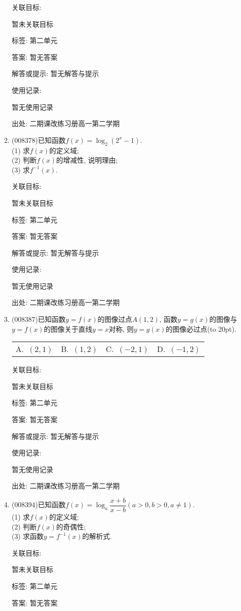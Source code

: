 \documentclass[10pt,a4paper]{article}
\newcommand{\bracket}[1]{(\hbox to #1pt{})}
\newcommand{\fourch}[4]{\par\begin{tabular}{p{.23\textwidth}p{.23\textwidth}p{.23\textwidth}p{.23\textwidth}}
A.~#1 &B.~#2& C.~#3& D.~#4
\end{tabular}}
\begin{document}
\begin{enumerate}[1.]
关联目标:

暂未关联目标



标签: 第二单元

答案: 暂无答案

解答或提示: 暂无解答与提示

使用记录:

暂无使用记录


出处: 二期课改练习册高一第二学期
\item { (008378)}已知函数$f(x)=\log _2(2^x-1)$.\\
(1) 求$f(x)$的定义域;\\
(2) 判断$f(x)$的增减性, 说明理由;\\
(3) 求$f^{-1}(x)$.


关联目标:

暂未关联目标



标签: 第二单元

答案: 暂无答案

解答或提示: 暂无解答与提示

使用记录:

暂无使用记录


出处: 二期课改练习册高一第二学期
\item { (008387)}已知函数$y=f(x)$的图像过点$A(1,2)$, 函数$y=g(x)$的图像与$y=f(x)$的图像关于直线$y=x$对称, 则$y=g(x)$的图像必过点\bracket{20}.
\fourch{$(2,1)$}{$(1,2)$}{$(-2,1)$}{$(-1,2)$}


关联目标:

暂未关联目标



标签: 第二单元

答案: 暂无答案

解答或提示: 暂无解答与提示

使用记录:

暂无使用记录


出处: 二期课改练习册高一第二学期
\item { (008394)}已知函数$f(x)=\log _a\dfrac{x+b}{x-b}(a>0,b>0, a\ne 1)$.\\
(1) 求$f(x)$的定义域;\\
(2) 判断$f(x)$的奇偶性;\\
(3) 求函数$y=f^{-1}(x)$的解析式.


关联目标:

暂未关联目标



标签: 第二单元

答案: 暂无答案


\end{enumerate}
\end{document}

